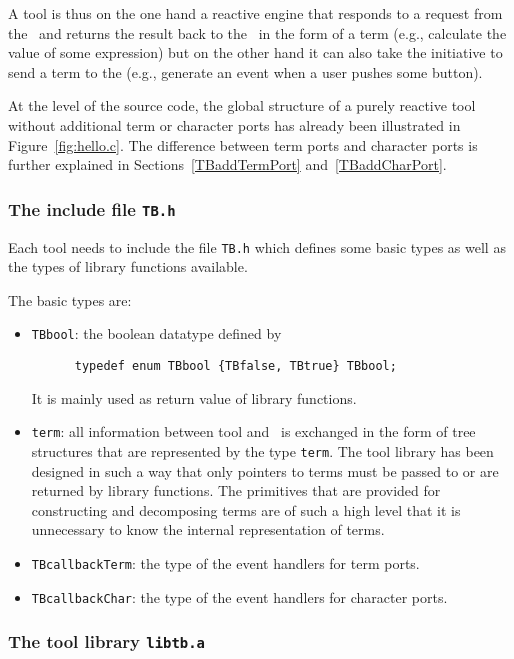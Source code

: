 A tool is thus on the one hand a reactive engine that responds to a
request from the \TB\ and returns the result back to the \TB\ in the
form of a term (e.g., calculate the value of some expression) but on
the other hand it can also take the initiative to send a term to the
\TB (e.g., generate an event when a user pushes some button).

At the level of the source code, the global structure of a purely
reactive tool without additional term or character ports
has already
been illustrated in Figure~\ref{fig:hello.c}.
The difference between term ports and character ports is further explained in 
Sections~\ref{TBaddTermPort} and~\ref{TBaddCharPort}.

\subsubsection{The include file {\tt TB.h}}

Each tool needs to include the file {\tt TB.h}
which defines some basic types as well as the types
of library functions available.

The basic types are:
\begin{itemize}
\item {\tt TBbool}: the boolean datatype defined by
\begin{verbatim}
      typedef enum TBbool {TBfalse, TBtrue} TBbool;
\end{verbatim}
It is mainly used as return value of library functions.

\item {\tt term}: all information between tool and \TB\ is exchanged
in the form of tree structures that are represented by the type
{\tt term}. The tool library has been designed in such a way that
only pointers to terms must be passed to or are returned by library
functions. The primitives that are provided for constructing
and decomposing terms are of such a high level that it is unnecessary
to know the internal representation of terms.

\item {\tt TBcallbackTerm}: the type of the event handlers for term ports.
\item {\tt TBcallbackChar}: the type of the event handlers for character ports.
\end{itemize}

\subsubsection{The tool library {\tt libtb.a}}

